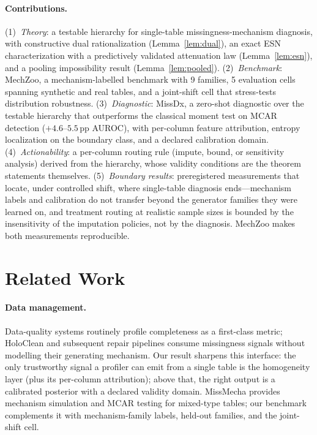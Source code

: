 \documentclass[conference]{IEEEtran}
\begin{document}
\paragraph{Contributions.} (1)~\emph{Theory}: a testable hierarchy for single-table
missingness-mechanism diagnosis, with constructive dual rationalization (Lemma~\ref{lem:dual}),
an exact ESN characterization with a predictively validated attenuation law
(Lemma~\ref{lem:esn}), and a pooling impossibility result (Lemma~\ref{lem:pooled}).
(2)~\emph{Benchmark}: MechZoo, a mechanism-labelled benchmark with 9 families, 5 evaluation
cells spanning synthetic and real tables, and a joint-shift cell that stress-tests
distribution robustness. (3)~\emph{Diagnostic}: MissDx, a zero-shot diagnostic over the
testable hierarchy that outperforms the classical moment test on MCAR detection
($+4.6$--$5.5$\,pp AUROC), with per-column feature attribution, entropy localization on the
boundary class, and a declared calibration domain. (4)~\emph{Actionability}: a per-column routing rule (impute, bound, or sensitivity
analysis) derived from the hierarchy, whose validity conditions are the theorem statements
themselves. (5)~\emph{Boundary results}: preregistered
measurements that locate, under controlled shift, where single-table diagnosis ends---mechanism
labels and calibration do not transfer beyond the generator families they were learned on, and
treatment routing at realistic sample sizes is bounded by the insensitivity of the imputation
policies, not by the diagnosis. MechZoo makes both measurements reproducible.


\section{Related Work}
\paragraph{Data management.} Data-quality systems routinely profile completeness as a
first-class metric; HoloClean \cite{holoclean2017} and subsequent repair pipelines consume
missingness signals without modelling their generating mechanism. Our result sharpens this
interface: the only trustworthy signal a profiler can emit from a single table is the
homogeneity layer (plus its per-column attribution); above that, the right output is a
calibrated posterior with a declared validity domain. MissMecha \cite{missmecha2025} provides
mechanism simulation and MCAR testing for mixed-type tables; our benchmark complements it
with mechanism-family labels, held-out families, and the joint-shift cell.
\end{document}
